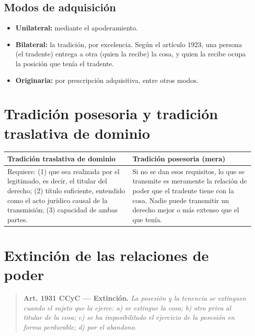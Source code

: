 \documentclass[12pt,oneside]{book}
\begin{document}
\subsection{Modos de adquisición}

\begin{itemize}
    \item \textbf{Unilateral:} mediante el apoderamiento.
    \item \textbf{Bilateral:} la tradición, por excelencia. Según el artículo 1923, una persona (el tradente) entrega a otra (quien la recibe) la cosa, y quien la recibe ocupa la posición que tenía el tradente.
    \item \textbf{Originaria:} por prescripción adquisitiva, entre otros modos.
\end{itemize}

\section{Tradición posesoria y tradición traslativa de dominio}

\begin{center}
\begin{tabularx}{\textwidth}{
    >{\raggedright\arraybackslash}X
    >{\raggedright\arraybackslash}X
}
\toprule
\textbf{Tradición traslativa de dominio} & \textbf{Tradición posesoria (mera)} \\
\midrule
Requiere: (1) que sea realizada por el legitimado, es decir, el titular del derecho; (2) título suficiente, entendido como el acto jurídico causal de la transmisión; (3) capacidad de ambas partes. &
Si no se dan esos requisitos, lo que se transmite es meramente la relación de poder que el tradente tiene con la cosa. Nadie puede transmitir un derecho mejor o más extenso que el que tenía. \\
\bottomrule
\end{tabularx}
\end{center}

\section{Extinción de las relaciones de poder}

\begin{quote}
\textbf{Art. 1931 CCyC --- Extinción.} \textit{La posesión y la tenencia se extinguen cuando el sujeto que la ejerce: a) se extingue la cosa; b) otro priva al titular de la cosa; c) se ha imposibilitado el ejercicio de la posesión en forma perdurable; d) por el abandono.}
\end{quote}
\end{document}
